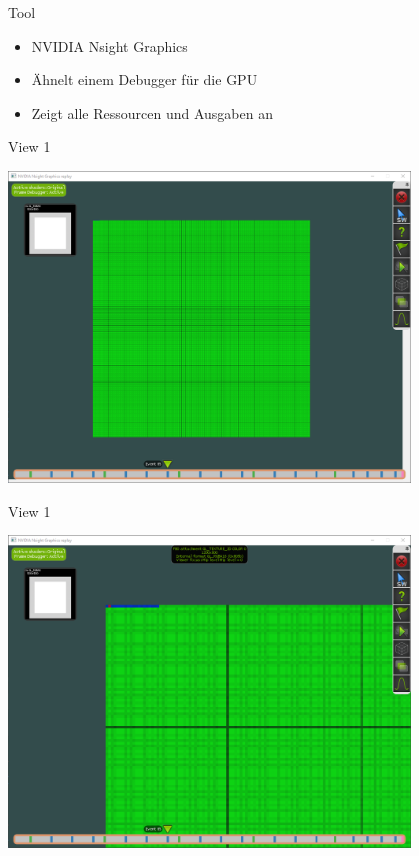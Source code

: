 \documentclass{../presentation}
\begin{document}
\begin{frame}{Tool}
    \begin{itemize}
        \item NVIDIA Nsight Graphics
        \item Ähnelt einem Debugger für die GPU
        \item Zeigt alle Ressourcen und Ausgaben an
    \end{itemize}
\end{frame}

\begin{frame}{View 1}
    \begin{center}
        \includegraphics[width=0.8\textwidth]{visualizer_1_full.png}
    \end{center}
\end{frame}

\begin{frame}{View 1}
    \begin{center}
        \includegraphics[width=0.8\textwidth]{visualizer_1_zoom.png}
    \end{center}
\end{frame}
\end{document}

